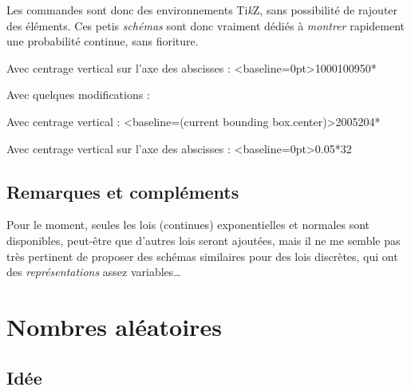 \documentclass[a4paper,french,11pt]{article}
\providecommand\tikzlogo{Ti\textit{k}Z}
\let\TikZ\tikzlogo
\begin{document}
\begin{codeinfo}
Les commandes sont donc des environnements \TikZ, sans possibilité de \og rajouter \fg{} des éléments. Ces petis \textit{schémas} sont donc vraiment dédiés à \textit{montrer} rapidement une probabilité continue, sans fioriture.
\end{codeinfo}

\begin{codetex}
Avec centrage vertical sur l'axe des abscisses :
\LoiNormaleGraphe[AfficheM=false,CouleurCourbe=Blue,CouleurAire=LightBlue]<baseline=0pt>{1000}{100}{950}{*}
\end{codetex}

\begin{codetex}
Avec quelques modifications :


\medskip

Avec centrage vertical :
\LoiNormaleGraphe[Largeur=5,Hauteur=2.5]<baseline=(current bounding box.center)>{200}{5}{204}{*}

\medskip

Avec centrage vertical sur l'axe des abscisses :
\LoiExpoGraphe[AfficheM=false,CouleurCourbe=Blue,CouleurAire=LightBlue]<baseline=0pt>{0.05}{*}{32}

\medskip

\end{codetex}

\subsection{Remarques et compléments}

\begin{codeinfo}
Pour le moment, seules les lois (continues) exponentielles et normales sont disponibles, peut-être que d'autres lois seront ajoutées, mais il ne me semble pas très pertinent de proposer des schémas similaires pour des lois discrètes, qui ont des \textit{représentations} assez variables\ldots
\end{codeinfo}

\newpage

\section{Nombres aléatoires}\label{entiersaleatoires}

\subsection{Idée}
\end{document}

